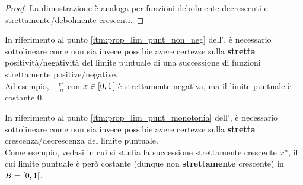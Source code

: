 \begin{exercise}
\begin{solution}
\begin{enumerate}
\begin{proof}
					La dimostrazione è analoga per funzioni debolmente decrescenti e strettamente/debolmente crescenti.
					\let\qed\relax %
				\end{proof}
			\vspace*{-2\baselineskip} %
		\end{enumerate}
	\end{solution}
\end{exercise}
\begin{observation}
	In riferimento al punto \ref{itm:prop_lim_punt_non_neg} dell', è necessario sottolineare come non sia invece possibie avere certezze sulla \textbf{stretta} positività/negatività del limite puntuale di una successione di funzioni strettamente positive/negative.\\
	Ad esempio, $-\frac{e^x}{n}$ con $x \in \left[0,1\right[$ è strettamente negativa, ma il limite puntuale è costante $0$.
\end{observation}
\begin{observation}
	In riferimento al punto \ref{itm:prop_lim_punt_monotonia} dell', è necessario sottolineare come non sia invece possibie avere certezze sulla \textbf{stretta} crescenza/decrescenza del limite puntuale.\\
	Come esempio, vedasi  in cui si studia la successione strettamente crescente $x^n$, il cui limite puntuale è però costante (dunque non \textbf{strettamente} crescente) in $B = \left[0,1\right[$.
\end{observation}

\cbstart
\begingroup
\renewcommand\theequation{\arabic{section}.\arabic{equation}}
\setcounter{equation}{0} %
